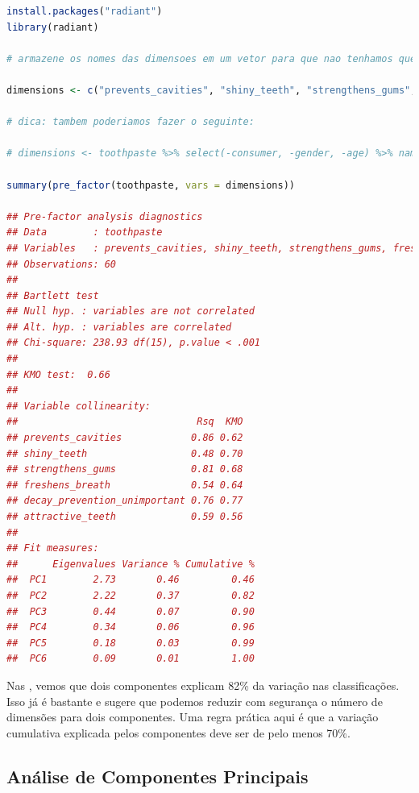 \documentclass{article}
\begin{document}
\begin{lstlisting}[language=R]
install.packages("radiant")
library(radiant)

# armazene os nomes das dimensoes em um vetor para que nao tenhamos que digita-las repetidamente

dimensions <- c("prevents_cavities", "shiny_teeth", "strengthens_gums", "freshens_breath", "decay_prevention_unimportant", "attractive_teeth") 

# dica: tambem poderiamos fazer o seguinte:

# dimensions <- toothpaste %>% select(-consumer, -gender, -age) %>% names()

summary(pre_factor(toothpaste, vars = dimensions))

## Pre-factor analysis diagnostics
## Data        : toothpaste 
## Variables   : prevents_cavities, shiny_teeth, strengthens_gums, freshens_breath, decay_prevention_unimportant, attractive_teeth 
## Observations: 60 
## 
## Bartlett test
## Null hyp. : variables are not correlated
## Alt. hyp. : variables are correlated
## Chi-square: 238.93 df(15), p.value < .001
## 
## KMO test:  0.66 
## 
## Variable collinearity:
##                               Rsq  KMO
## prevents_cavities            0.86 0.62
## shiny_teeth                  0.48 0.70
## strengthens_gums             0.81 0.68
## freshens_breath              0.54 0.64
## decay_prevention_unimportant 0.76 0.77
## attractive_teeth             0.59 0.56
## 
## Fit measures:
##      Eigenvalues Variance % Cumulative %
##  PC1        2.73       0.46         0.46
##  PC2        2.22       0.37         0.82
##  PC3        0.44       0.07         0.90
##  PC4        0.34       0.06         0.96
##  PC5        0.18       0.03         0.99
##  PC6        0.09       0.01         1.00
\end{lstlisting}


Nas , vemos que dois componentes explicam 82\% da variação nas classificações. Isso já é bastante e sugere que podemos reduzir com segurança o número de dimensões para dois componentes. Uma regra prática aqui é que a variação cumulativa explicada pelos componentes deve ser de pelo menos 70\%.

\newpage
\subsection{Análise de Componentes Principais}
\end{document}
